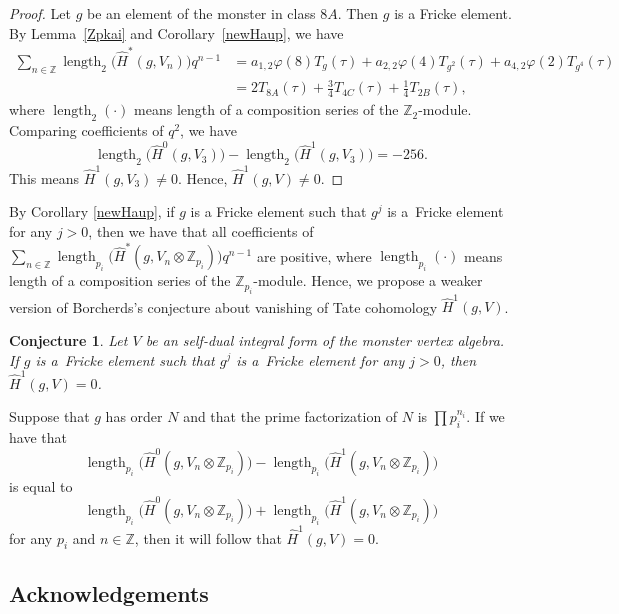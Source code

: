 \documentclass[10pt,a4paper]{amsart}
\numberwithin{equation}{section}
\newtheorem{Conjecture}[Theorem]{Conjecture}
\begin{document}
\begin{proof}
Let $g$ be an element of the monster in class $8A$. Then $g$ is a Fricke element. By Lemma~\ref{Zpkai} and Corollary~\ref{newHaup}, we have
\begin{align*}
\sum_{n \in \mathbb{Z}}\operatorname{length}_2\big(\hat{H}^*(g,V_n)\big)q^{n-1} &=a_{1,2}\varphi(8)T_g(\tau)+a_{2,2}\varphi(4)T_{g^2}(\tau)+a_{4,2}\varphi(2)T_{g^4}(\tau) \\
 &= 2T_{8A}(\tau)+\frac{3}{4}T_{4C}(\tau)+\frac{1}{4}T_{2B}(\tau),
\end{align*}
where $\operatorname{length}_2(\cdot)$ means length of a composition series of the $\mathbb{Z}_2$-module.
Comparing coefficients of $q^2$, we have
\[
\operatorname{length}_2\big(\hat{H}^0(g,V_3)\big)-\operatorname{length}_2\big(\hat{H}^1(g,V_3)\big)=-256.
\]
This means $\hat{H}^1(g,V_3)\neq 0$. Hence, $\hat{H}^1(g,V)\neq 0$.
\end{proof}

 By Corollary \ref{newHaup}, if $g$ is a Fricke element such that $g^j$ is a~Fricke element for any $j> 0$, then we have that all coefficients of $\sum_{n\in \mathbb{Z}}\operatorname{length}_{p_i}\big(\hat{H}^*(g,V_n\otimes \mathbb{Z}_{p_i})\big)q^{n-1}$ are positive, where $\operatorname{length}_{p_i}(\cdot)$ means length of a composition series of the $\mathbb{Z}_{p_i}$-module. Hence, we propose a weaker version of Borcherds's conjecture about vanishing of Tate cohomology $\hat{H}^1(g,V)$.

\begin{Conjecture}
Let $V$ be an self-dual integral form of the monster vertex algebra. If $g$ is a~Fricke element such that $g^j$ is a~Fricke element for any $j> 0$, then $\hat{H}^1(g,V)=0$.
\end{Conjecture}

 Suppose that $g$ has order $N$ and that the prime factorization of $N$ is $\prod p_i^{n_i}$. If we have that
\[
\operatorname{length}_{p_i}\big(\hat{H}^0(g,V_n\otimes\mathbb{Z}_{p_i})\big)-\operatorname{length}_{p_i}\big(\hat{H}^1(g,V_n\otimes\mathbb{Z}_{p_i})\big)
\]
 is equal to
\[
\operatorname{length}_{p_i}\big(\hat{H}^0(g,V_n\otimes\mathbb{Z}_{p_i})\big)+\operatorname{length}_{p_i}\big(\hat{H}^1(g,V_n\otimes\mathbb{Z}_{p_i})\big)
\]
for any $p_i$ and $n\in \mathbb{Z}$, then it will follow that $\hat{H}^1(g,V)=0$.

\subsection*{Acknowledgements}
\end{document}
